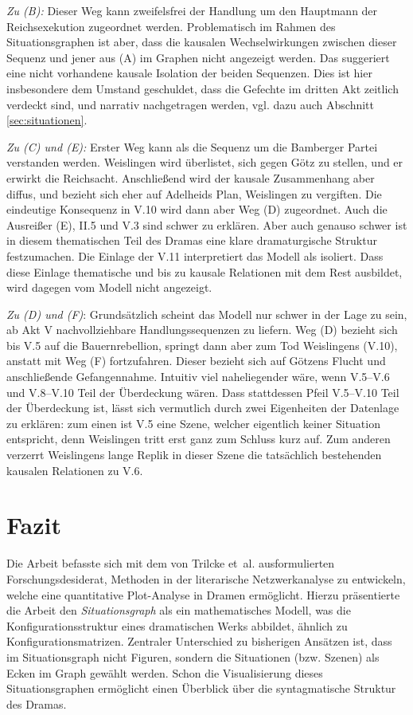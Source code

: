 \documentclass[a4paper,10pt,abstract=true,headings=small]{scrartcl}
\begin{document}
\emph{Zu (B):} Dieser Weg kann zweifelsfrei der Handlung um den Hauptmann der Reichsexekution zugeordnet werden.
Problematisch im Rahmen des Situationsgraphen ist aber, dass die kausalen Wechselwirkungen zwischen dieser Sequenz und jener aus (A) im Graphen nicht angezeigt werden.
Das suggeriert eine nicht vorhandene kausale Isolation der beiden Sequenzen.
Dies ist hier insbesondere dem Umstand geschuldet, dass die Gefechte im dritten Akt zeitlich verdeckt sind, und narrativ nachgetragen werden, vgl. dazu auch Abschnitt \ref{sec:situationen}.

\emph{Zu (C) und (E):} Erster Weg kann als die Sequenz um die Bamberger Partei verstanden werden.
Weislingen wird überlistet, sich gegen Götz zu stellen, und er erwirkt die Reichsacht.
Anschließend wird der kausale Zusammenhang aber diffus, und bezieht sich eher auf Adelheids Plan, Weislingen zu vergiften.
Die eindeutige Konsequenz in V.10 wird dann aber Weg (D) zugeordnet.
Auch die Ausreißer (E), II.5 und V.3 sind schwer zu erklären.
Aber auch genauso schwer ist in diesem thematischen Teil des Dramas eine klare dramaturgische Struktur festzumachen.
Die Einlage der V.11  interpretiert das Modell als isoliert. %
Dass diese Einlage thematische und bis zu kausale Relationen mit dem Rest ausbildet, wird dagegen vom Modell nicht angezeigt.

\emph{Zu (D) und (F)}: Grundsätzlich scheint das Modell nur schwer in der Lage zu sein, ab Akt V nachvollziehbare Handlungssequenzen zu liefern.
Weg (D) bezieht sich bis V.5 auf die Bauernrebellion, springt dann aber zum Tod Weislingens (V.10), anstatt mit Weg (F) fortzufahren.
Dieser bezieht sich auf Götzens Flucht und anschließende Gefangennahme.
Intuitiv viel naheliegender wäre, wenn V.5–V.6 und V.8–V.10 Teil der Überdeckung wären.
Dass stattdessen Pfeil V.5–V.10 Teil der Überdeckung ist, lässt sich vermutlich durch zwei Eigenheiten der Datenlage zu erklären: zum einen ist V.5  eine Szene, welcher eigentlich keiner Situation entspricht, denn Weislingen tritt erst ganz zum Schluss kurz auf.
Zum anderen verzerrt Weislingens lange Replik in dieser Szene die tatsächlich bestehenden kausalen Relationen zu V.6.


\section{Fazit}

Die Arbeit befasste sich mit dem von Trilcke et~al. ausformulierten Forschungsdesiderat, Methoden in der literarische Netzwerkanalyse zu entwickeln, welche eine quantitative Plot-Analyse in Dramen ermöglicht.
Hierzu präsentierte die Arbeit den \emph{Situationsgraph} als ein mathematisches Modell, was die Konfigurationsstruktur eines dramatischen Werks abbildet, ähnlich zu Konfigurationsmatrizen.
Zentraler Unterschied zu bisherigen Ansätzen ist, dass im Situationsgraph nicht Figuren, sondern die Situationen (bzw. Szenen) als Ecken im Graph gewählt werden.
Schon die Visualisierung dieses Situationsgraphen ermöglicht einen Überblick über die syntagmatische Struktur des Dramas.
\end{document}
